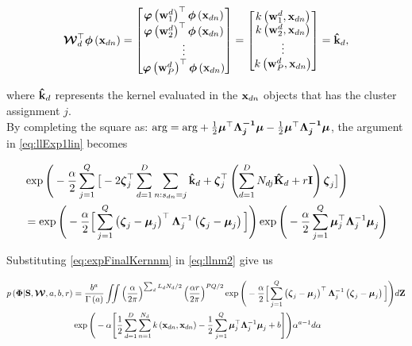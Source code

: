 	\begin{align}
	\boldsymbol{\mathcal{W}}_d^\top \boldsymbol{\phi}\left(\mathbf{x}_{dn}\right) = 
	\left[ \begin{matrix}
	\boldsymbol{\varphi}\left(\mathbf{w}_{1}^d\right)^\top\boldsymbol{\phi}\left(\mathbf{x}_{dn}\right)\\
	\boldsymbol{\varphi}\left(\mathbf{w}_{2}^d\right)^\top\boldsymbol{\phi}\left(\mathbf{x}_{dn}\right)\\
	\vdots\\
	\boldsymbol{\varphi}\left(\mathbf{w}_{P}^d\right)^\top\boldsymbol{\phi}\left(\mathbf{x}_{dn}\right)\\
	\end{matrix}\right]
	= 
	\left[ \begin{matrix}
	k\left(\mathbf{w}_{1}^d,\mathbf{x}_{dn}\right)\\
	k\left(\mathbf{w}_{2}^d,\mathbf{x}_{dn}\right)\\
	\vdots\\
	k\left(\mathbf{w}_{P}^d,\mathbf{x}_{dn}\right) 
	\end{matrix}\right] = \mathbf{\hat{k}}_d, \label{eq:kp}
	\end{align}
	
	where $\mathbf{\hat{k}}_d$ represents the kernel evaluated in the $\mathbf{x}_{dn}$ objects that has the cluster assignment $j$.\\
	
	By completing the square as: $\textrm{arg} = \textrm{arg} + \frac{1}{2}\boldsymbol{\mu}^\top\boldsymbol{\boldsymbol{\Lambda}_j^{-1}}\boldsymbol{\mu} -\frac{1}{2}\boldsymbol{\mu}^\top\boldsymbol{\boldsymbol{\Lambda}_j^{-1}}\boldsymbol{\mu}$, the argument in \eqref{eq:llExp1lin} becomes
	
	\begin{align}
	&\exp\Bigg(-\frac{\alpha}{2}\sum_{j=1}^Q \big[ -2 \boldsymbol{\zeta}_j ^\top  \sum_{d=1}^{D} \sum_{n:s_{dn}=j}\mathbf{\hat{k}}_d+\boldsymbol{\zeta}_j^\top  \left(\sum_{d=1}^{D} N_{dj}\mathbf{\hat{K}}_d + r\mathbf{I}\right) \boldsymbol{\zeta}_j \big]\Bigg) \notag\\ &= \exp\Bigg(-\frac{\alpha}{2}\Big[\sum_{j=1}^{Q} \left(\boldsymbol{\zeta}_j-\boldsymbol{\mu}_j\right)^\top\boldsymbol{\Lambda}_j^{-1}\left(\boldsymbol{\zeta}_j-\boldsymbol{\mu}_j\right)\Big]\Bigg)
	\exp\Bigg(-\frac{\alpha}{2}\sum_{j=1}^{Q}\boldsymbol{\mu}_j^\top\boldsymbol{\Lambda}_j^{-1}\boldsymbol{\mu}_j\Bigg) \label{eq:expFinalKernnm}
	\end{align}
	
	
	Substituting \eqref{eq:expFinalKernnm} in \eqref{eq:llnm2} give us
	
	\begin{align}
	p\left(\boldsymbol{\Phi}|\mathbf{S},\boldsymbol{\mathcal{W}},a,b,r\right)&=\frac{b^a}{\Gamma\left(a\right)}\iint \left(\frac{\alpha}{2\pi}\right)^{\sum_d L_d N_d /2}\left(\frac{\alpha r}{2\pi}\right)^{PQ/2}\exp\Bigg(-\frac{\alpha}{2}\Big[\sum_{j=1}^{Q} \left(\boldsymbol{\zeta}_j-\boldsymbol{\mu}_j\right)^\top\boldsymbol{\Lambda}_j^{-1}\left(\boldsymbol{\zeta}_j-\boldsymbol{\mu}_j\right)\Big]\Bigg)d\boldsymbol{\mathrm{Z}} \notag\\
	&\exp\Bigg(-\alpha\Bigg[\frac{1}{2} \sum_{d=1}^{D}\sum_{n=1}^{N_d}k\left(\mathbf{x}_{dn},\mathbf{x}_{dn}\right)  -\frac{1}{2}\sum_{j=1}^{Q}\boldsymbol{\mu}_j^\top\boldsymbol{\Lambda}_j^{-1}\boldsymbol{\mu}_j +b \Bigg]\Bigg)\alpha^{a-1}d\alpha \label{eq:llFinalIntegralsnm}
	\end{align}
	
